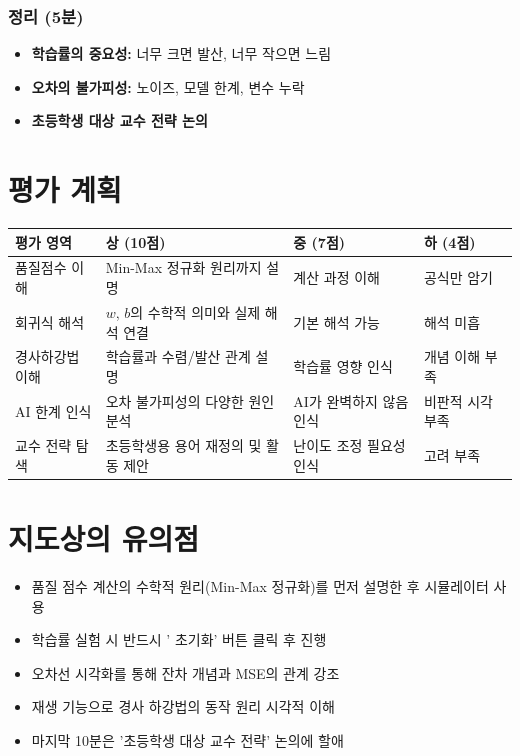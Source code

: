\documentclass[11pt,a4paper]{article}
\begin{document}
\subsubsection{정리 (5분)}

\begin{itemize}
    \item \textbf{학습률의 중요성:} 너무 크면 발산, 너무 작으면 느림
    \item \textbf{오차의 불가피성:} 노이즈, 모델 한계, 변수 누락
    \item \textbf{초등학생 대상 교수 전략 논의}
\end{itemize}

\section{평가 계획}

\begin{center}
\small
\begin{tabular}{|p{2.3cm}|p{3.5cm}|p{3.5cm}|p{3.5cm}|}
\hline
\textbf{평가 영역} & \textbf{상 (10점)} & \textbf{중 (7점)} & \textbf{하 (4점)} \\
\hline
품질점수 이해 & Min-Max 정규화 원리까지 설명 & 계산 과정 이해 & 공식만 암기 \\
\hline
회귀식 해석 & $w$, $b$의 수학적 의미와 실제 해석 연결 & 기본 해석 가능 & 해석 미흡 \\
\hline
경사하강법 이해 & 학습률과 수렴/발산 관계 설명 & 학습률 영향 인식 & 개념 이해 부족 \\
\hline
AI 한계 인식 & 오차 불가피성의 다양한 원인 분석 & AI가 완벽하지 않음 인식 & 비판적 시각 부족 \\
\hline
교수 전략 탐색 & 초등학생용 용어 재정의 및 활동 제안 & 난이도 조정 필요성 인식 & 고려 부족 \\
\hline
\end{tabular}
\end{center}

\section{지도상의 유의점}

\begin{itemize}
    \item 품질 점수 계산의 수학적 원리(Min-Max 정규화)를 먼저 설명한 후 시뮬레이터 사용
    \item 학습률 실험 시 반드시 ' 초기화' 버튼 클릭 후 진행
    \item 오차선 시각화를 통해 잔차 개념과 MSE의 관계 강조
    \item {} 재생 기능으로 경사 하강법의 동작 원리 시각적 이해
    \item 마지막 10분은 '초등학생 대상 교수 전략' 논의에 할애
\end{itemize}
\end{document}
